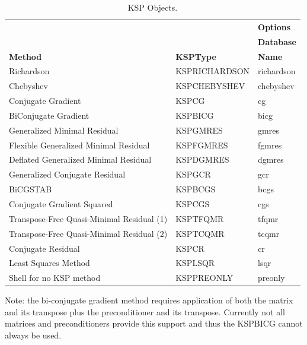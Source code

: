 \begin{table}
\begin{center}
\begin{tabular}{lll}
& & {\bf Options}       \\
& & {\bf Database}      \\
{\bf Method}    &{\bf KSPType}  & {\bf Name}    \\
\hline
Richardson                                & KSPRICHARDSON & richardson \\
Chebyshev                                 & KSPCHEBYSHEV  & chebyshev   \\
Conjugate Gradient \cite{hs:52}           & KSPCG         & cg          \\
BiConjugate Gradient                      & KSPBICG       & bicg        \\
Generalized Minimal Residual \cite{ss:86} & KSPGMRES      & gmres       \\
Flexible Generalized Minimal Residual     & KSPFGMRES     & fgmres       \\
Deflated Generalized Minimal Residual     & KSPDGMRES     & dgmres       \\
Generalized Conjugate Residual            & KSPGCR        & gcr       \\
BiCGSTAB \cite{v:92}                      & KSPBCGS       & bcgs         \\
Conjugate Gradient Squared \cite{so:89}   & KSPCGS        & cgs          \\
Transpose-Free Quasi-Minimal Residual (1) \cite{f:93} & KSPTFQMR & tfqmr  \\
Transpose-Free Quasi-Minimal Residual (2) & KSPTCQMR      & tcqmr        \\
Conjugate Residual                        & KSPCR         & cr           \\
Least Squares Method                      & KSPLSQR       & lsqr         \\
Shell for no KSP method                   & KSPPREONLY    & preonly      \\
\hline
\end{tabular}
\medskip \medskip
\end{center}
\caption{KSP Objects.}
\label{tab_kspdefaults}
\end{table}

Note: the bi-conjugate gradient method requires application of both the matrix and
its transpose plus the preconditioner and its transpose. Currently not all matrices
and preconditioners provide this support and thus the KSPBICG cannot always
be used. 

